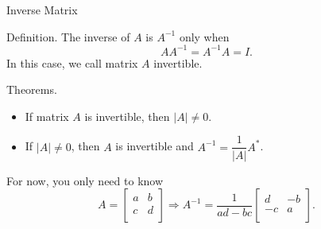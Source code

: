 \documentclass[11pt,aspectratio=169]{beamer}
\begin{document}
    \begin{frame}[t]{Inverse Matrix}
        \par \textcolor{yy}{Definition.} The \textcolor{yy}{inverse} of $A$ is $A^{-1}$ only when 
        \begin{equation*}
            AA^{-1} = A^{-1}A = I.
        \end{equation*}
        In this case, we call matrix $A$ \textcolor{yy}{invertible}.

        \phantom{yy}

        \textcolor{yy}{Theorems.}
        \begin{itemize}
            \item If matrix $A$ is invertible, then $|A| \neq 0$. 
            \item If $|A| \neq 0$, then $A$ is invertible and $A^{-1} = \dfrac{1}{|A|} A^{*}$. 
        \end{itemize}

        \phantom{yy} 

        \par For now, you only need to know 
        \begin{equation*}
            A = \left[\begin{array}{cc} a & b \\ c & d \\ \end{array} \right] \Rightarrow A^{-1} = \frac{1}{ad - bc} \left[ \begin{array}{cc} d & -b \\ -c & a \\ \end{array} \right]. 
        \end{equation*}
    \end{frame}
\end{document}

